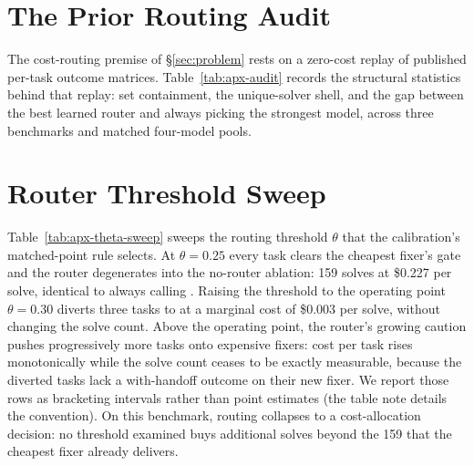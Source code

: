 
\section{The Prior Routing Audit}
\label{apx:audit}

The cost-routing premise of \S\ref{sec:problem} rests on a zero-cost replay of
published per-task outcome matrices.  Table~\ref{tab:apx-audit} records the
structural statistics behind that replay: set containment, the unique-solver
shell, and the gap between the best learned router and always picking the
strongest model, across three benchmarks and matched four-model pools.

\begin{table}[H]
\centering
\footnotesize
\caption{\textbf{Why we do not route for accuracy.}
Zero-cost audit of published per-task outcome matrices on matched four-model
pools.  \emph{Containment} measures solve-set nesting; the
\emph{unique-solver shell} is the share of routable tasks only one model
solves.  On all three benchmarks, no learned router beat always calling the
strongest model.  This is background motivation, not a system result.}
\label{tab:apx-audit}

\end{table}



\section{Router Threshold Sweep}
\label{apx:theta-sweep}

Table~\ref{tab:apx-theta-sweep} sweeps the routing threshold $\theta$ that
the calibration's matched-point rule selects.  At $\theta{=}0.25$ every task
clears the cheapest fixer's gate and the router degenerates into the no-router
ablation: 159 solves at \$0.227 per solve, identical to always calling
\fxkimi.  Raising the threshold to the operating point $\theta{=}0.30$ diverts
three tasks to \fxflash at a marginal cost of \$0.003 per solve, without
changing the solve count.  Above the operating point, the router's growing
caution pushes progressively more tasks onto expensive fixers: cost per task
rises monotonically while the solve count ceases to be exactly measurable,
because the diverted tasks lack a with-handoff outcome on their new fixer.
We report those rows as bracketing intervals rather than point estimates (the
table note details the convention).  On this benchmark, routing collapses to
a cost-allocation decision: no threshold examined buys additional solves
beyond the 159 that the cheapest fixer already delivers.

